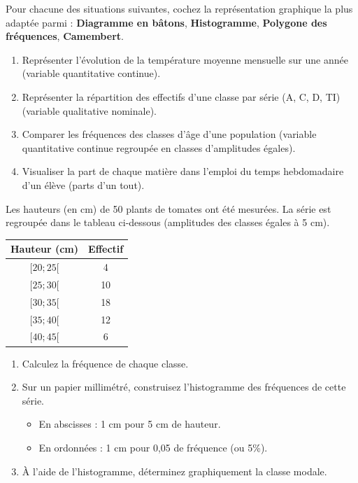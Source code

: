 \documentclass[11pt]{article}
\begin{document}
\begin{exercice}
Pour chacune des situations suivantes, cochez la représentation graphique la plus adaptée parmi : \textbf{Diagramme en bâtons}, \textbf{Histogramme}, \textbf{Polygone des fréquences}, \textbf{Camembert}.

\begin{enumerate}
    \item Représenter l'évolution de la température moyenne mensuelle sur une année (variable quantitative continue).
    \item Représenter la répartition des effectifs d'une classe par série (A, C, D, TI) (variable qualitative nominale).
    \item Comparer les fréquences des classes d'âge d'une population (variable quantitative continue regroupée en classes d'amplitudes égales).
    \item Visualiser la part de chaque matière dans l'emploi du temps hebdomadaire d'un élève (parts d'un tout).
\end{enumerate}
\end{exercice}

\begin{exercice}
Les hauteurs (en cm) de 50 plants de tomates ont été mesurées. La série est regroupée dans le tableau ci-dessous (amplitudes des classes égales à 5 cm).

\begin{center}
\begin{tabular}{|c|c|}
\hline
\textbf{Hauteur (cm)} & \textbf{Effectif} \\
\hline
$[20 ; 25[$ & 4 \\
\hline
$[25 ; 30[$ & 10 \\
\hline
$[30 ; 35[$ & 18 \\
\hline
$[35 ; 40[$ & 12 \\
\hline
$[40 ; 45[$ & 6 \\
\hline
\end{tabular}
\end{center}

\begin{enumerate}
    \item Calculez la fréquence de chaque classe.
    \item Sur un papier millimétré, construisez l'histogramme des fréquences de cette série.
    \begin{itemize}
        \item En abscisses : 1 cm pour 5 cm de hauteur.
        \item En ordonnées : 1 cm pour 0,05 de fréquence (ou 5\%).
    \end{itemize}
    \item À l'aide de l'histogramme, déterminez graphiquement la classe modale.
\end{enumerate}
\end{exercice}
\end{document}
